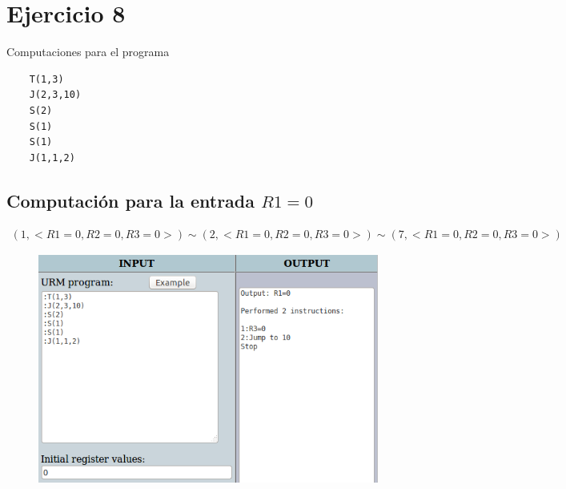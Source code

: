 \section{Ejercicio 8}
	Computaciones para el programa
	\begin{verbatim}
	T(1,3)
	J(2,3,10)
	S(2)
	S(1)
	S(1)
	J(1,1,2)
	\end{verbatim}
	\subsection{Computación para la entrada $R1=0$}
	\begin{equation*}\begin{gathered}
	(1, <R1=0, R2=0, R3=0>) \sim (2, <R1=0, R2=0, R3=0>) \sim (7, <R1=0, R2=0, R3=0>)
	\end{gathered}\end{equation*}
	\begin{figure}[H]
  		\centering
  		\includegraphics[scale=0.5]{images/80.png}
  	\end{figure}
